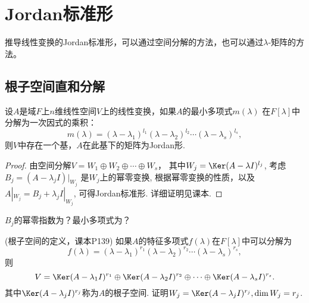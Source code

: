 \section{Jordan标准形}
推导线性变换的Jordan标准形，可以通过空间分解的方法，也可以通过$\lambda$-矩阵的方法。

\subsection{根子空间直和分解}
\begin{theorem}
	设$A$是域$F$上$n$维线性空间$V$上的线性变换，如果$A$的最小多项式$m(\lambda)$
	在$F[\lambda]$中分解为一次因式的乘积：
	\begin{equation}
		m(\lambda) = (\lambda-\lambda_1)^{l_1}(\lambda-\lambda_2)^{l_2}\cdots(\lambda-\lambda_s)^{l_s},
		\label{equ:m}
	\end{equation}
	则$V$中存在一个基，$A$在此基下的矩阵为Jordan形. 
\end{theorem}
\begin{proof}
	由空间分解$V = W_1 \oplus W_2 \oplus \cdots \oplus W_s$，
	其中$W_j = \Ker (A-\lambda I)^{l_j}$, 考虑$B_j = (A-\lambda_j I)|_{W_j}$
	是$W_j$上的幂零变换, 根据幂零变换的性质，以及$A|_{W_j} = B_j + \lambda_j I|_{W_j}$,
	可得Jordan标准形. 详细证明见课本.
\end{proof}

\begin{remark}
	$B_j$的幂零指数为？最小多项式为？
\end{remark}
\vspace{1.5cm}

\begin{remark} (根子空间的定义，课本P139)
	如果$A$的特征多项式$f(\lambda)$在$F[\lambda]$中可以分解为
	\begin{equation}
		f(\lambda) = (\lambda-\lambda_1)^{r_1}(\lambda-\lambda_2)^{r_2}\cdots(\lambda-\lambda_s)^{r_s},
		\label{equ:f}
	\end{equation}
	则
	$$V = \Ker (A-\lambda_1I)^{r_1} \oplus \Ker (A-\lambda_2I)^{r_2} \oplus \cdots \oplus \Ker (A-\lambda_sI)^{r_s}.$$
	其中$\Ker (A-\lambda_jI)^{r_j}$称为$A$的根子空间.
	证明$W_j = \Ker (A-\lambda_jI)^{r_j}, \dim W_j = r_j$.
\end{remark}
\vspace{5cm}

